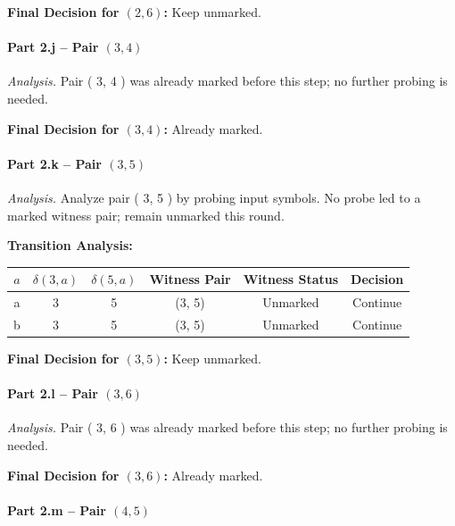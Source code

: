 \documentclass{article}
\begin{document}
\noindent\textbf{Final Decision for $( 2, 6 )$:} Keep unmarked.

\vspace{0.75em}
\paragraph{Part 2.j \;–\; Pair $( 3, 4 )$}

\emph{Analysis.} Pair ( 3, 4 ) was already marked before this step; no further probing is needed.

\noindent\textbf{Final Decision for $( 3, 4 )$:} Already marked.

\vspace{0.75em}
\paragraph{Part 2.k \;–\; Pair $( 3, 5 )$}

\emph{Analysis.} Analyze pair ( 3, 5 ) by probing input symbols. No probe led to a marked witness pair; remain unmarked this round.

\noindent\textbf{Transition Analysis:}
\begin{center}
\begin{tabular}{c c c c c c}
\hline
$a$ & $\delta(3,a)$ & $\delta(5,a)$ & Witness Pair & Witness Status & Decision \\
\hline
a & 3 & 5 &
(3, 5) &
Unmarked &
Continue \\
b & 3 & 5 &
(3, 5) &
Unmarked &
Continue \\
\hline
\end{tabular}
\end{center}



\noindent\textbf{Final Decision for $( 3, 5 )$:} Keep unmarked.

\vspace{0.75em}
\paragraph{Part 2.l \;–\; Pair $( 3, 6 )$}

\emph{Analysis.} Pair ( 3, 6 ) was already marked before this step; no further probing is needed.

\noindent\textbf{Final Decision for $( 3, 6 )$:} Already marked.

\vspace{0.75em}
\paragraph{Part 2.m \;–\; Pair $( 4, 5 )$}
\end{document}
